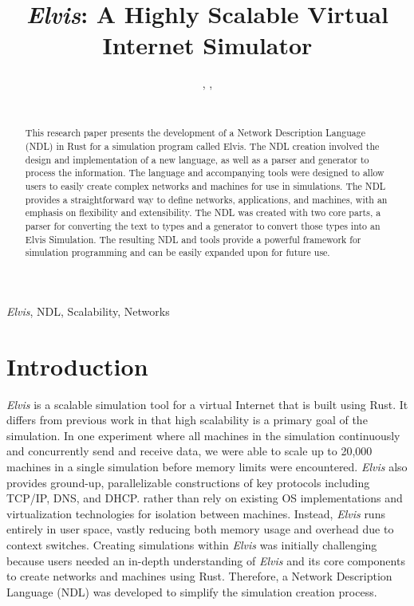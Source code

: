 \documentclass[journal]{IEEEtran} %
\newcommand{\elvis}{\textit{Elvis}}
\begin{document}
\title{\elvis{}: A Highly Scalable Virtual Internet Simulator\\}

\author{%
    ,
    ,
    \\%
    \\%
}

\maketitle

\begin{abstract}
This research paper presents the development of a Network Description Language (NDL) in Rust for a simulation program called Elvis. The NDL creation involved the design and implementation of a new language, as well as a parser and generator to process the information. The language and accompanying tools were designed to allow users to easily create complex networks and machines for use in simulations. The NDL provides a straightforward way to define networks, applications, and machines, with an emphasis on flexibility and extensibility. The NDL was created with two core parts, a parser for converting the text to types and a generator to convert those types into an Elvis Simulation. The resulting NDL and tools provide a powerful framework for simulation programming and can be easily expanded upon for future use.

\end{abstract}

\begin{IEEEkeywords}
\elvis{}, NDL, Scalability, Networks
\end{IEEEkeywords}

\section{Introduction}
\elvis{} is a scalable simulation tool for a virtual Internet that is built using Rust. It differs from previous work in that high scalability is a primary goal of the simulation. In one experiment where all machines in the simulation continuously and concurrently send and receive data, we were able to scale up to 20,000 machines in a single simulation before memory limits were encountered. \elvis{} also provides ground-up, parallelizable constructions of key protocols including TCP/IP, DNS, and DHCP. rather than rely on existing OS implementations and virtualization technologies for isolation between machines. Instead, \elvis{} runs entirely in user space, vastly reducing both memory usage and overhead due to context switches.
Creating simulations within \elvis{} was initially challenging because users needed an in-depth understanding of \elvis{} and its core components to create networks and machines using Rust. Therefore, a Network Description Language (NDL) was developed to simplify the simulation creation process.
\end{document}
